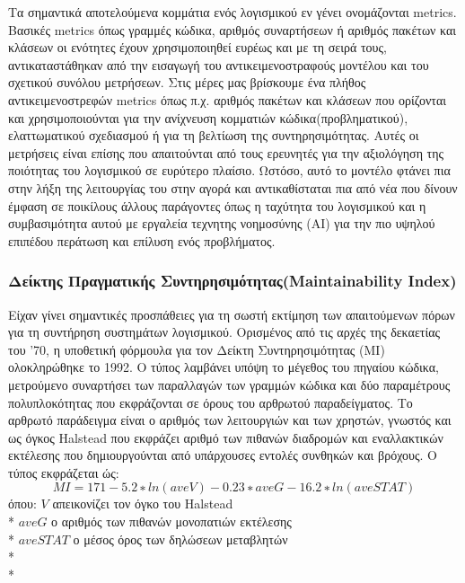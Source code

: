 \documentclass[a4paper, 11pt]{article}
\begin{document}
{{Τα σημαντικά αποτελούμενα κομμάτια ενός λογισμικού εν γένει ονομάζονται \textlatin{metrics}.
Βασικές \textlatin{metrics} όπως γραμμές κώδικα, αριθμός συναρτήσεων ή αριθμός πακέτων και κλάσεων
οι ενότητες έχουν χρησιμοποιηθεί ευρέως και με τη σειρά τους, αντικαταστάθηκαν από την εισαγωγή του αντικειμενοστραφούς μοντέλου  και του σχετικού συνόλου μετρήσεων. Στις μέρες μας βρίσκουμε ένα
πλήθος αντικειμενοστρεφών \textlatin{metrics} όπως π.χ. αριθμός πακέτων και κλάσεων που ορίζονται και χρησιμοποιούνται για την ανίχνευση κομματιών κώδικα(προβληματικού),
ελαττωματικού σχεδιασμού ή για τη βελτίωση της συντηρησιμότητας. Αυτές οι μετρήσεις είναι επίσης
που απαιτούνται από τους ερευνητές για την αξιολόγηση της ποιότητας του λογισμικού σε ευρύτερο πλαίσιο. Ωστόσο, αυτό το μοντέλο φτάνει πια στην λήξη της λειτουργίας του στην αγορά και αντικαθίσταται πια από νέα που δίνουν έμφαση σε ποικίλους άλλους παράγοντες όπως η ταχύτητα του λογισμικού και η συμβασιμότητα αυτού με εργαλεία τεχνητης νοημοσύνης (ΑΙ) για την πιο υψηλού επιπέδου περάτωση και επίλυση ενός προβλήματος. 

\subsubsection{Δείκτης Πραγματικής Συντηρησιμότητας(\textlatin{Maintainability Index})}
Είχαν γίνει σημαντικές προσπάθειες για τη σωστή εκτίμηση των απαιτούμενων
πόρων για τη συντήρηση συστημάτων λογισμικού. Ορισμένος από τις αρχές της δεκαετίας του '70, η
υποθετική φόρμουλα για τον Δείκτη Συντηρησιμότητας (MI) ολοκληρώθηκε το 1992. Ο τύπος λαμβάνει υπόψη το μέγεθος του πηγαίου κώδικα, μετρούμενο συναρτήσει
    των παραλλαγών των γραμμών κώδικα και δύο παραμέτρους πολυπλοκότητας που εκφράζονται σε
όρους του αρθρωτού παραδείγματος. Το αρθρωτό παράδειγμα είναι ο αριθμός των λειτουργιών και των χρηστών, γνωστός και ως όγκος \textlatin{Halstead} που εκφράζει αριθμό των πιθανών διαδρομών και εναλλακτικών εκτέλεσης που δημιουργούνται από υπάρχουσες εντολές συνθηκών και βρόχους.
Ο τύπος εκφράζεται ώς:
\[M I = 171 − 5.2 ∗ ln(aveV ) − 0.23 ∗ aveG − 16.2 ∗ ln(aveST AT )\] όπου:  \(V\) απεικονίζει τον όγκο του \textlatin{Halstead}\\*
\(aveG\) ο αριθμός των πιθανών μονοπατιών εκτέλεσης\\*
\(aveSTAT\) ο μέσος όρος των δηλώσεων μεταβλητών\\*
\\*
}}
\end{document}
